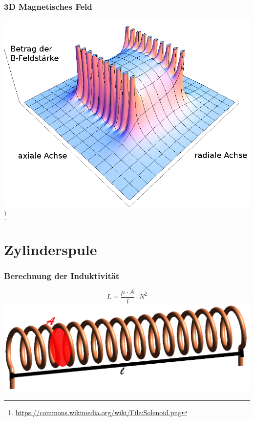 \begin{frame}
    \frametitle{3D Magnetisches Feld}
    \begin{center}
        \includegraphics[width=1\textwidth]{e06/3-D_HFeld.png}
        \footnote{\tiny \url{https://commons.wikimedia.org/wiki/File:Solenoid.png}}
    \end{center}

\end{frame}

\section*{Zylinderspule}

\begin{frame}
    \frametitle{Berechnung der Induktivität}
    \begin{center}
      $$L = \frac{\mu \cdot A}{l}\cdot N^2$$
        \includegraphics[width=1\textwidth]{e06/Luftspule.png}
    \end{center}
\end{frame}

